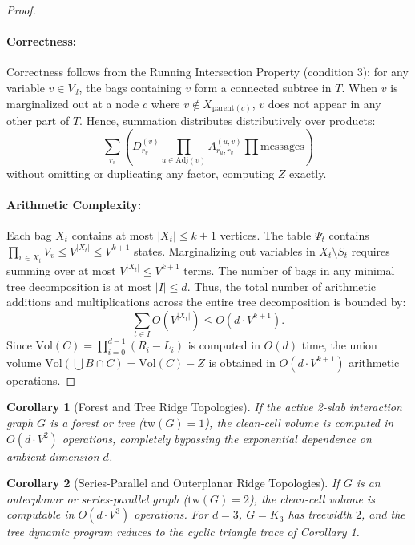 \documentclass[11pt,a4paper]{article}
\theoremstyle{plain}
\newtheorem{corollary}{Corollary}
\theoremstyle{definition}
\begin{document}
\begin{proof}
\paragraph{Correctness:} Correctness follows from the Running Intersection Property (condition 3): for any variable $v \in V_d$, the bags containing $v$ form a connected subtree in $T$. When $v$ is marginalized out at a node $c$ where $v \notin X_{\mathrm{parent}(c)}$, $v$ does not appear in any other part of $T$. Hence, summation distributes distributively over products:
\[
\sum_{r_v} \left( D^{(v)}_{r_v} \prod_{u \in \mathrm{Adj}(v)} A^{(u, v)}_{r_u, r_v} \prod \text{messages} \right)
\]
without omitting or duplicating any factor, computing $Z$ exactly.

\paragraph{Arithmetic Complexity:}
Each bag $X_t$ contains at most $|X_t| \le k + 1$ vertices. The table $\Psi_t$ contains $\prod_{v \in X_t} V_v \le V^{|X_t|} \le V^{k+1}$ states. Marginalizing out variables in $X_t \setminus S_t$ requires summing over at most $V^{|X_t|} \le V^{k+1}$ terms. The number of bags in any minimal tree decomposition is at most $|I| \le d$. Thus, the total number of arithmetic additions and multiplications across the entire tree decomposition is bounded by:
\begin{equation}
\sum_{t \in I} O\left(V^{|X_t|}\right) \le O\left(d \cdot V^{k+1}\right).
\end{equation}
Since $\mathrm{Vol}(C) = \prod_{i=0}^{d-1} (R_i - L_i)$ is computed in $O(d)$ time, the union volume $\mathrm{Vol}(\bigcup B \cap C) = \mathrm{Vol}(C) - Z$ is obtained in $O(d \cdot V^{k+1})$ arithmetic operations.
\end{proof}

\begin{corollary}[Forest and Tree Ridge Topologies]
If the active 2-slab interaction graph $G$ is a forest or tree ($\mathrm{tw}(G) = 1$), the clean-cell volume is computed in $O(d \cdot V^2)$ operations, completely bypassing the exponential dependence on ambient dimension $d$.
\end{corollary}

\begin{corollary}[Series-Parallel and Outerplanar Ridge Topologies]
If $G$ is an outerplanar or series-parallel graph ($\mathrm{tw}(G) = 2$), the clean-cell volume is computable in $O(d \cdot V^3)$ operations. For $d=3$, $G = K_3$ has treewidth $2$, and the tree dynamic program reduces to the cyclic triangle trace of Corollary 1.
\end{corollary}
\end{document}
